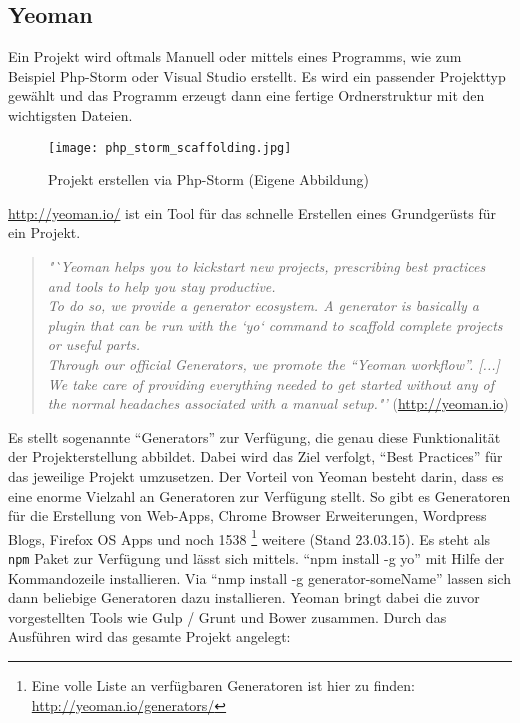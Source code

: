 
	\subsection{Yeoman} %
	\label{sub:yeoman}
		Ein Projekt wird oftmals Manuell oder mittels eines Programms, wie zum Beispiel Php-Storm oder Visual Studio erstellt. Es wird ein passender Projekttyp gewählt und das Programm erzeugt dann eine fertige Ordnerstruktur mit den wichtigsten Dateien.

		\begin{figure}[htbp]
			\begin{center}
				\texttt{[image: php\_storm\_scaffolding.jpg]}
				\caption{Projekt erstellen via Php-Storm (Eigene Abbildung)}
				\label{fig:php_storm_scaffolding}
			\end{center}
		\end{figure}
		
		\url{http://yeoman.io/} ist ein Tool für das schnelle Erstellen eines Grundgerüsts für ein Projekt.

		\begin{quote}
			\textit{"`Yeoman helps you to kickstart new projects, prescribing best practices and tools to help you stay productive.\\
			To do so, we provide a generator ecosystem. A generator is basically a plugin that can be run with the `yo` command to scaffold complete projects or useful parts.\\
			Through our official Generators, we promote the "`Yeoman workflow"'. [...] We take care of providing everything needed to get started without any of the normal headaches associated with a manual setup."'} (\url{http://yeoman.io})
		\end{quote}

		Es stellt sogenannte "`Generators"' zur Verfügung, die genau diese Funktionalität der Projekterstellung abbildet. Dabei wird das Ziel verfolgt, "`Best Practices"' für das jeweilige Projekt umzusetzen.
		Der Vorteil von Yeoman besteht darin, dass es eine enorme Vielzahl an Generatoren zur Verfügung stellt. So gibt es Generatoren für die Erstellung von Web-Apps, Chrome Browser Erweiterungen, Wordpress Blogs, Firefox OS Apps und noch 1538 \footnote{Eine volle Liste an verfügbaren Generatoren ist hier zu finden: \url{http://yeoman.io/generators/}} weitere (Stand 23.03.15). 
		Es steht als \texttt{npm} Paket zur Verfügung und lässt sich mittels. "`npm install -g yo"' mit Hilfe der Kommandozeile installieren. Via "`nmp install -g generator-someName"' lassen sich dann beliebige Generatoren dazu installieren. Yeoman bringt dabei die zuvor vorgestellten Tools wie Gulp / Grunt und Bower zusammen. Durch das Ausführen wird das gesamte Projekt angelegt:
		
